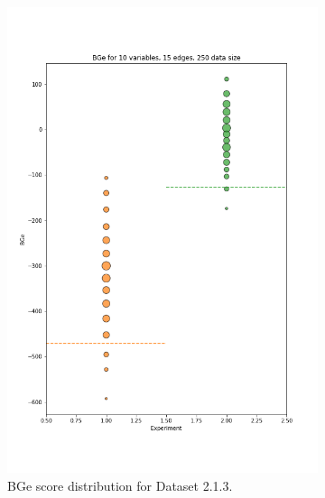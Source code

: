 \documentclass{lxaiproposal}
\begin{document}
\begin{figure}[h]
\begin{subfigure}{0.32\textwidth}
            \includegraphics[width=\textwidth]{figures/BGe_10_15_250}
            \caption{BGe score distribution for Dataset 2.1.3.}
            \label{fig:bge_score_10_15_250}
        \end{subfigure}
        \hfill
        \begin{subfigure}{0.32\textwidth}
            \centering

\end{subfigure}
\end{figure}
\end{document}
